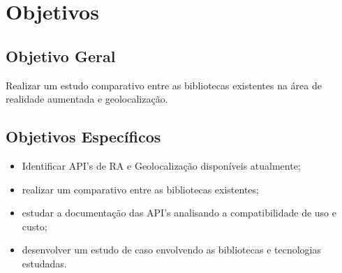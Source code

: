 \section{Objetivos}
\subsection{Objetivo Geral }
	Realizar um estudo comparativo entre as bibliotecas existentes na área de realidade aumentada e geolocalização.

\subsection{Objetivos Específicos}
\begin{itemize}
	\item Identificar API's de RA  e Geolocalização disponíveis atualmente;
	\item realizar um comparativo entre as bibliotecas existentes;
	\item estudar a documentação das API's analisando a compatibilidade de uso e custo;
	\item desenvolver um estudo de caso envolvendo as bibliotecas e tecnologias estudadas.
\end{itemize}

